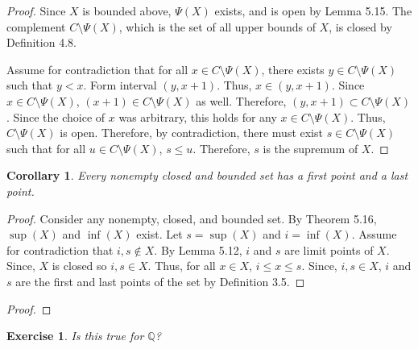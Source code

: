 \documentclass{amsart}
\newtheorem{corollary}[theorem]{Corollary}
\newtheorem{exercise}[theorem]{Exercise}
\newcommand{\1}{\mathds{1}}
\numberwithin{equation}{section}
\numberwithin{theorem}{section}
\begin{document}
\begin{proof}
	Since $X$ is bounded above, $\Psi(X)$ exists, and is open by Lemma 5.15. The complement $C\setminus \Psi(X)$, which is the set of all upper bounds of $X$, is closed by 
	Definition 4.8. 
	
	Assume for contradiction that for all $x\in C\setminus \Psi(X)$, there exists $y\in C\setminus \Psi(X)$ such that $y<x$. Form interval $(y,x+1)$. Thus, $x\in (y,x+1)$. Since $x\in C\setminus \Psi(X)$, $(x+1)\in C\setminus \Psi(X)$ as well. Therefore, $(y,x+1)\subset C\setminus \Psi(X)$. Since the choice of $x$ was arbitrary, this holds for any $x\in C\setminus \Psi(X)$. Thus,  $C\setminus \Psi(X)$ is open. Therefore, by contradiction, there must exist $s\in C\setminus \Psi(X)$ such that for all $u\in C\setminus \Psi(X)$, $s\le u$. Therefore, $s$ is the supremum of $X$.
\end{proof}

\begin{corollary}  Every nonempty closed and bounded set has a first point and a last point.
\end{corollary}

\begin{proof}
	Consider any nonempty, closed, and bounded set. By Theorem 5.16, $\sup (X)$ and $\inf (X)$ exist. Let $s = \sup (X)$ and $i = \inf (X)$.  Assume for contradiction that $i,s\notin X$. By Lemma 5.12, $i$ and $s$ are limit points of $X$. Since, $X$ is closed so $i,s\in X$. Thus, for all $x\in X$, $i \le x \le s$. Since, $i,s\in X$, $i$ and $s$ are the first and last points of the set by Definition 3.5.
	
\end{proof}

\begin{proof}
	
	
\end{proof}

\begin{exercise}  Is this true for $\mathbb{Q}$?
\end{exercise}
\end{document}
